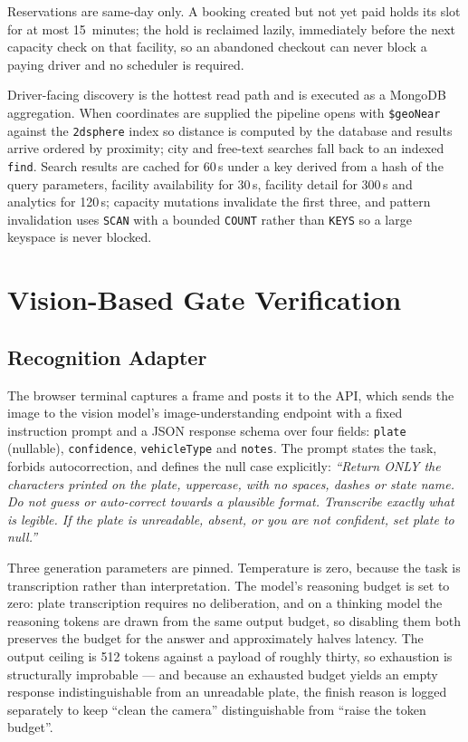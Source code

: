 \documentclass[journal,onecolumn,11pt]{IEEEtran}
\begin{document}
Reservations are same-day only. A booking created but not yet paid holds its
slot for at most 15~minutes; the hold is reclaimed lazily, immediately before
the next capacity check on that facility, so an abandoned checkout can never
block a paying driver and no scheduler is required.

Driver-facing discovery is the hottest read path and is executed as a MongoDB
aggregation. When coordinates are supplied the pipeline opens with
\texttt{\$geoNear} against the \texttt{2dsphere} index so distance is computed
by the database and results arrive ordered by proximity; city and free-text
searches fall back to an indexed \texttt{find}. Search results are cached for
60\,s under a key derived from a hash of the query parameters, facility
availability for 30\,s, facility detail for 300\,s and analytics for 120\,s;
capacity mutations invalidate the first three, and pattern invalidation uses
\texttt{SCAN} with a bounded \texttt{COUNT} rather than \texttt{KEYS} so a
large keyspace is never blocked.

\section{Vision-Based Gate Verification}
\label{sec:recognition}

\subsection{Recognition Adapter}

The browser terminal captures a frame and posts it to the API, which sends the
image to the vision model's image-understanding endpoint \cite{googleaidocs}
with a fixed instruction prompt and a JSON response schema over four fields:
\texttt{plate} (nullable), \texttt{confidence}, \texttt{vehicleType} and
\texttt{notes}. The prompt states the task, forbids autocorrection, and defines
the null case explicitly: \textit{``Return ONLY the characters printed on the
plate, uppercase, with no spaces, dashes or state name. Do not guess or
auto-correct towards a plausible format. Transcribe exactly what is legible. If
the plate is unreadable, absent, or you are not confident, set plate to null.''}

Three generation parameters are pinned. Temperature is zero, because the task
is transcription rather than interpretation. The model's reasoning budget is
set to zero: plate transcription requires no deliberation, and on a thinking
model the reasoning tokens are drawn from the same output budget, so disabling
them both preserves the budget for the answer and approximately halves latency.
The output ceiling is 512 tokens against a payload of roughly thirty, so
exhaustion is structurally improbable --- and because an exhausted budget
yields an empty response indistinguishable from an unreadable plate, the finish
reason is logged separately to keep ``clean the camera'' distinguishable from
``raise the token budget''.
\end{document}

